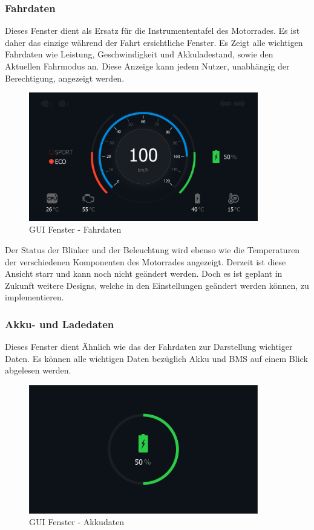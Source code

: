 \subsubsection{Fahrdaten}		

Dieses Fenster dient als Ersatz für die Instrumententafel des Motorrades. Es ist daher das einzige während der Fahrt ersichtliche Fenster. Es Zeigt alle wichtigen Fahrdaten wie Leistung, Geschwindigkeit und Akkuladestand, sowie den Aktuellen Fahrmodus an. Diese Anzeige kann jedem Nutzer, unabhängig der Berechtigung, angezeigt werden.

\begin{figure}[H]
	\begin{center}
		\includegraphics[width=10cm]{figures/hcis/window_dashboard.png}
			\caption{GUI Fenster - Fahrdaten}
			\label{fig:pageDash}
	\end{center}
\end{figure}

Der Status der Blinker und der Beleuchtung wird ebenso wie die Temperaturen der verschiedenen Komponenten des Motorrades angezeigt. Derzeit ist diese Ansicht starr und kann noch nicht geändert werden. Doch es ist geplant in Zukunft weitere Designs, welche in den Einstellungen geändert werden können, zu implementieren.

\newpage

\subsubsection{Akku- und Ladedaten}

Dieses Fenster dient Ähnlich wie das der Fahrdaten zur Darstellung wichtiger Daten. Es können alle wichtigen Daten bezüglich Akku und BMS auf einem Blick abgelesen werden. 

\begin{figure}[H]
	\begin{center}
		\includegraphics[width=10cm]{figures/hcis/window_battery.png}
			\caption{GUI Fenster - Akkudaten}
			\label{fig:pageAkku}
	\end{center}
\end{figure}

